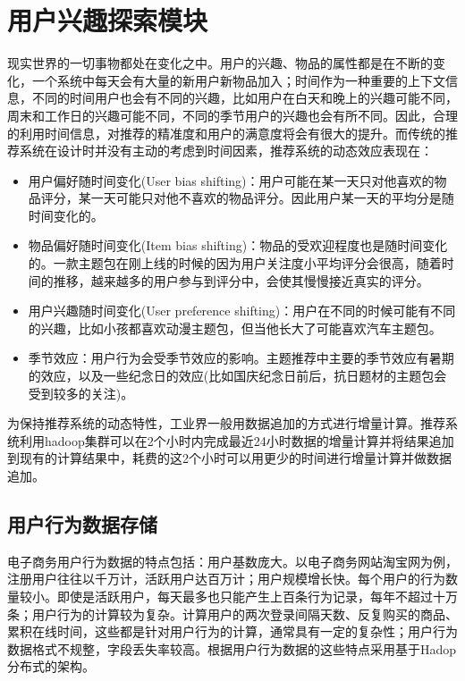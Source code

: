 	\section{用户兴趣探索模块}
		现实世界的一切事物都处在变化之中。用户的兴趣、物品的属性都是在不断的变化，一个系统中每天会有大量的新用户新物品加入；时间作为一种重要的上下文信息，不同的时间用户也会有不同的兴趣，比如用户在白天和晚上的兴趣可能不同，周末和工作日的兴趣可能不同，不同的季节用户的兴趣也会有所不同。因此，合理的利用时间信息，对推荐的精准度和用户的满意度将会有很大的提升。而传统的推荐系统在设计时并没有主动的考虑到时间因素，推荐系统的动态效应表现在：
		\begin{itemize}
		\item 用户偏好随时间变化(User bias shifting)：用户可能在某一天只对他喜欢的物品评分，某一天可能只对他不喜欢的物品评分。因此用户某一天的平均分是随时间变化的。
		\item 物品偏好随时间变化(Item bias shifting)：物品的受欢迎程度也是随时间变化的。一款主题包在刚上线的时候的因为用户关注度小平均评分会很高，随着时间的推移，越来越多的用户参与到评分中，会使其慢慢接近真实的评分。
		\item 用户兴趣随时间变化(User preference shifting)：用户在不同的时候可能有不同的兴趣，比如小孩都喜欢动漫主题包，但当他长大了可能喜欢汽车主题包。
		\item 季节效应：用户行为会受季节效应的影响。主题推荐中主要的季节效应有暑期的效应，以及一些纪念日的效应(比如国庆纪念日前后，抗日题材的主题包会受到较多的关注)。
		\end{itemize}

		为保持推荐系统的动态特性，工业界一般用数据追加的方式进行增量计算。推荐系统利用hadoop集群可以在2个小时内完成最近24小时数据的增量计算并将结果追加到现有的计算结果中，耗费的这2个小时可以用更少的时间进行增量计算并做数据追加。

		\subsection{用户行为数据存储}
		电子商务用户行为数据的特点包括：用户基数庞大。以电子商务网站淘宝网为例，注册用户往往以千万计，活跃用户达百万计；用户规模增长快。每个用户的行为数量较小。即使是活跃用户，每天最多也只能产生上百条行为记录，每年不超过十万条；用户行为的计算较为复杂。计算用户的两次登录间隔天数、反复购买的商品、累积在线时间，这些都是针对用户行为的计算，通常具有一定的复杂性；用户行为数据格式不规整，字段丢失率较高。根据用户行为数据的这些特点采用基于Hadop分布式的架构。

